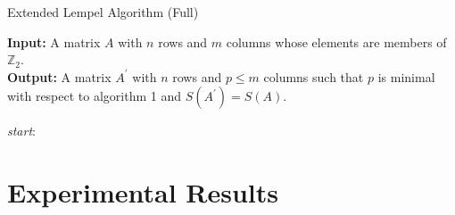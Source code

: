 \documentclass{article}
\theoremstyle{definition}
\theoremstyle{problem}
\theoremstyle{lemma}
\begin{document}
		\begin{algorithm}
			\caption{Extended Lempel Algorithm (Full)}
			\label{alg_full}
			\textbf{Input:} A matrix $A$ with $n$ rows and $m$ columns whose elements are members of $\mathbb{Z}_2$.\\
			\textbf{Output:} A matrix $A^\prime$ with $n$ rows and $p \leq m$ columns such that $p$ is minimal with respect to algorithm 1 and $S(A^\prime) = S(A)$.
			\begin{algorithmic}[1]
				\BState \emph{start}:
				\Else
				\EndIf
				\EndProcedure
			\end{algorithmic}
		\end{algorithm}
			
				
				
				
				
				
				
				
			
			\FloatBarrier
			\section{Experimental Results}			
			
			\label{s5_Results}
\end{document}
